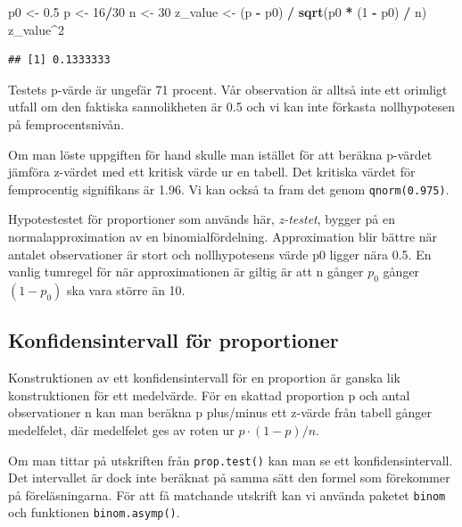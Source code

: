 \documentclass[
]{book}
\newenvironment{Shaded}{\begin{snugshade}}{\end{snugshade}}
\newcommand{\DecValTok}[1]{\textcolor[rgb]{0.00,0.00,0.81}{#1}}
\newcommand{\FloatTok}[1]{\textcolor[rgb]{0.00,0.00,0.81}{#1}}
\newcommand{\FunctionTok}[1]{\textcolor[rgb]{0.13,0.29,0.53}{\textbf{#1}}}
\newcommand{\NormalTok}[1]{#1}
\newcommand{\OtherTok}[1]{\textcolor[rgb]{0.56,0.35,0.01}{#1}}
\newcommand{\SpecialCharTok}[1]{\textcolor[rgb]{0.81,0.36,0.00}{\textbf{#1}}}
\theoremstyle{definition}
\theoremstyle{definition}
\theoremstyle{definition}
\theoremstyle{definition}
\theoremstyle{remark}
\begin{document}
\begin{Shaded}
\begin{Highlighting}[]
\NormalTok{p0 }\OtherTok{\textless{}{-}} \FloatTok{0.5}
\NormalTok{p }\OtherTok{\textless{}{-}} \DecValTok{16}\SpecialCharTok{/}\DecValTok{30}
\NormalTok{n }\OtherTok{\textless{}{-}} \DecValTok{30}
\NormalTok{z\_value }\OtherTok{\textless{}{-}}\NormalTok{ (p }\SpecialCharTok{{-}}\NormalTok{ p0) }\SpecialCharTok{/} \FunctionTok{sqrt}\NormalTok{(p0 }\SpecialCharTok{*}\NormalTok{ (}\DecValTok{1} \SpecialCharTok{{-}}\NormalTok{ p0) }\SpecialCharTok{/}\NormalTok{ n)}
\NormalTok{z\_value}\SpecialCharTok{\^{}}\DecValTok{2}
\end{Highlighting}
\end{Shaded}

\begin{verbatim}
## [1] 0.1333333
\end{verbatim}

Testets p-värde är ungefär 71 procent. Vår observation är alltså inte ett orimligt utfall om den faktiska sannolikheten är 0.5 och vi kan inte förkasta nollhypotesen på femprocentsnivån.

Om man löste uppgiften för hand skulle man istället för att beräkna p-värdet jämföra z-värdet med ett kritisk värde ur en tabell. Det kritiska värdet för femprocentig signifikans är 1.96. Vi kan också ta fram det genom \texttt{qnorm(0.975)}.

Hypotestestet för proportioner som används här, \emph{z-testet}, bygger på en normalapproximation av en binomialfördelning. Approximation blir bättre när antalet observationer är stort och nollhypotesens värde p0 ligger nära 0.5. En vanlig tumregel för när approximationen är giltig är att n gånger \(p_0\) gånger \((1 - p_0)\) ska vara större än 10.

\subsection{Konfidensintervall för proportioner}\label{konfidensintervall-fuxf6r-proportioner}

Konstruktionen av ett konfidensintervall för en proportion är ganska lik konstruktionen för ett medelvärde. För en skattad proportion p och antal observationer n kan man beräkna p plus/minus ett z-värde från tabell gånger medelfelet, där medelfelet ges av roten ur \(p \cdot (1 - p) / n\).

Om man tittar på utskriften från \texttt{prop.test()} kan man se ett konfidensintervall. Det intervallet är dock inte beräknat på samma sätt den formel som förekommer på föreläsningarna. För att få matchande utskrift kan vi använda paketet \texttt{binom} och funktionen \texttt{binom.asymp()}.
\end{document}
